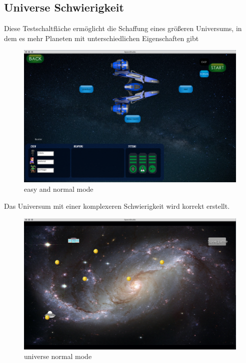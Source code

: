 \documentclass[12pt]{article}
\begin{document}
\newpage
\subsection{Universe Schwierigkeit}

Diese Testschaltfläche ermöglicht die Schaffung eines größeren Universums, in dem es mehr Planeten mit unterschiedlichen Eigenschaften gibt\\
\begin{figure}
\centering
\includegraphics[scale=0.3]{TestProtocolBilder/universeButon.png}
\caption{easy and normal mode}
\end{figure}

\newpage
Das Universum mit einer komplexeren Schwierigkeit wird korrekt erstellt.\\

\begin{figure}[t]
\centering
\includegraphics[scale=0.3]{TestProtocolBilder/universeHard.png}
\caption{universe normal mode}
\end{figure}
\end{document}
